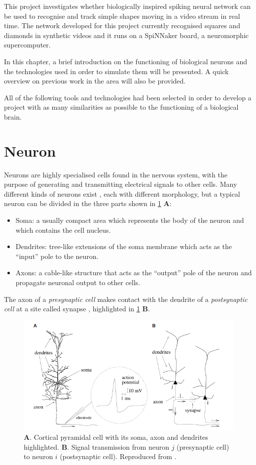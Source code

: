 This project investigates whether biologically inspired spiking neural network can be used to recognise and track simple shapes moving in a video stream in real time. The network developed for this project currently recognised squares and diamonds in synthetic videos and it runs on a SpiNNaker board, a neuromorphic supercomputer. 

In this chapter, a brief introduction on the functioning of biological neurons and the technologies used in order to simulate them will be presented. A quick overview on previous work in the area will also be provided. 

All of the following tools and technologies had been selected in order to develop a project with as many similarities as possible to the functioning of a biological brain. 


\section{Neuron}
Neurons are highly specialised cells found in the nervous system, with the purpose of generating and transmitting electrical signals to other cells. Many different kinds of neurons exist \cite{Llinas:2008}, each with different morphology, but a typical neuron can be divided in the three parts shown in \cref{fig:neuron_morphology} \textbf{A}:
\begin{itemize}
    \item Soma: a usually compact area which represents the body of the neuron and which contains the cell nucleus.
    \item Dendrites: tree-like extensions of the soma membrane which acts as the ``input'' pole to the neuron.
    \item Axons: a cable-like structure that acts as the ``output'' pole of the neuron and propagate neuronal output to other cells.
\end{itemize}
The axon of a \textit{presynaptic cell} makes contact with the dendrite of a \textit{postsynaptic cell} at a site called synapse \cite{Gerstner:2014}, highlighted in \cref{fig:neuron_morphology} \textbf{B}.

\begin{figure}[ht]
\centering
\includegraphics[scale=0.6]{images/context/neuron.png}
\caption[Neuron Morphology]{\textbf{A}. Cortical pyramidal cell with its soma, axon and dendrites highlighted. \textbf{B}. Signal transmission from neuron $j$ (presynaptic cell) to neuron $i$ (postsynaptic cell). Reproduced from \cite{Gerstner:2014}.}
\label{fig:neuron_morphology}
\end{figure}

